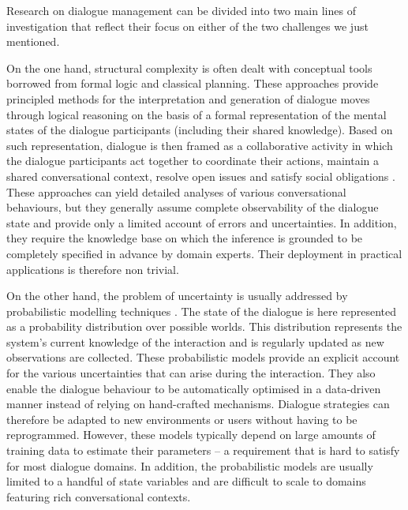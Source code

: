 
Research on dialogue management can be divided into two main lines of investigation that reflect their focus on either of the two challenges we just mentioned.  

On the one hand, structural complexity is often dealt with conceptual tools borrowed from formal logic and classical planning.  These approaches provide principled methods for the interpretation and generation of dialogue moves through logical reasoning on the basis of a formal representation of the mental states of the dialogue participants (including their shared knowledge). Based on such representation, dialogue is then framed as a collaborative activity in which the dialogue participants act together to coordinate their actions, maintain a shared conversational context, resolve open issues and satisfy social obligations \citep{larsson2002,Jokinen:2009,Ginzburg2012}. These approaches can yield detailed analyses of various conversational behaviours, but they generally assume complete observability of the dialogue state and provide only a limited account of errors and uncertainties. In addition, they require the knowledge base on which the inference is grounded to be completely specified in advance by domain experts.  Their deployment in practical applications is therefore non trivial. 

On the other hand, the problem of uncertainty is usually addressed by probabilistic modelling techniques \citep{Roy:2000,FramptonL09,Young:2010}.  The state of the dialogue is here represented as a probability distribution over possible worlds.  This distribution represents the system's current knowledge of the interaction and is regularly updated as new observations are collected. These probabilistic models provide an explicit account for the various uncertainties that can arise during the interaction. They also enable the dialogue behaviour to be automatically optimised in a data-driven manner instead of relying on hand-crafted mechanisms.  Dialogue strategies can therefore be adapted to new environments or users without having to be reprogrammed. However, these models typically depend on large amounts of training data to estimate their parameters -- a requirement that is hard to satisfy for most dialogue domains.  In addition, the probabilistic models are usually limited to a handful of state variables and are difficult to scale to domains featuring rich conversational contexts. 

